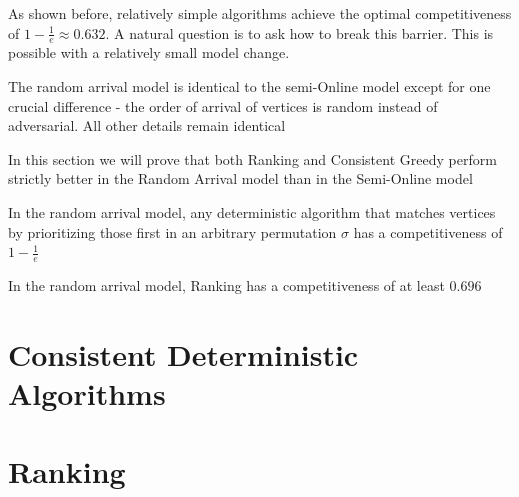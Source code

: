As shown before, relatively simple algorithms achieve the optimal competitiveness of $1-\frac{1}{e}\approx0.632$. A natural question is to ask how to break this barrier. This is possible with a relatively small model change.

\begin{definition}
	The random arrival model is identical to the semi-Online model except for one crucial difference - the order of arrival of vertices is random instead of adversarial. All other details remain identical
\end{definition}

In this section we will prove that both Ranking and Consistent Greedy perform strictly better in the Random Arrival model than in the Semi-Online model

\begin{theorem}
	\label{thm:rga-ra-comp}
	In the random arrival model, any deterministic algorithm that matches vertices by prioritizing those first in an arbitrary permutation $\sigma$ has a competitiveness of $1-\frac{1}{e}$
\end{theorem}

\begin{theorem}
	\label{thm:rank-ra-comp}
	In the random arrival model, Ranking has a competitiveness of at least $0.696$
\end{theorem}

\section{Consistent Deterministic Algorithms}



\section{Ranking}

